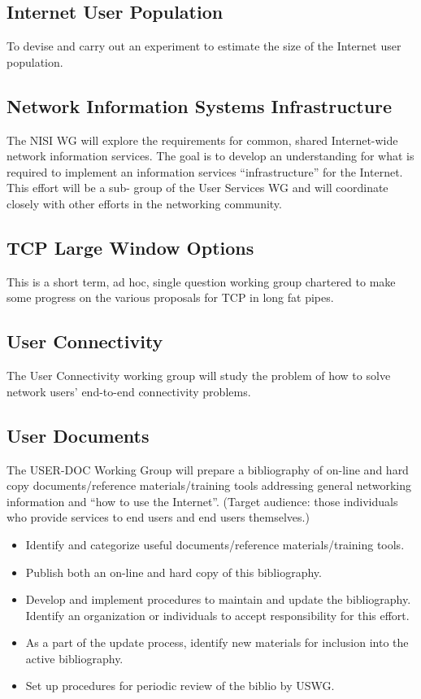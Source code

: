 \subsection{Internet User Population}

To devise and carry out an experiment to estimate the size of the
Internet user population.


\subsection{Network Information Systems Infrastructure}

The NISI WG will explore the requirements for common, shared
Internet-wide network information services. The goal is to develop an
understanding for what is required to implement an information
services ``infrastructure'' for the Internet. This effort will be a
sub- group of the User Services WG and will coordinate closely with
other efforts in the networking community.

\subsection{TCP Large Window Options}

This is a short term, ad hoc, single question working group chartered
to make some progress on the various proposals for TCP in long fat
pipes.

\subsection{User Connectivity}

The User Connectivity working group will study the problem of how to
solve network users' end-to-end connectivity problems.

\subsection{User Documents}

The USER-DOC Working Group will prepare a bibliography of on-line and
hard copy documents/reference materials/training tools addressing
general networking information and ``how to use the Internet''.
(Target audience: those individuals who provide services to end users
and end users themselves.)

\begin{itemize}
\item
   Identify and categorize useful documents/reference
     materials/training tools.
\item
   Publish both an on-line and hard copy of this bibliography.
\item
   Develop and implement procedures to maintain and update the
     bibliography.  Identify an organization or individuals to accept
     responsibility for this effort.
\item
   As a part of the update process, identify new materials for
     inclusion into the active bibliography.
\item
   Set up procedures for periodic review of the biblio by USWG.

\end{itemize}


